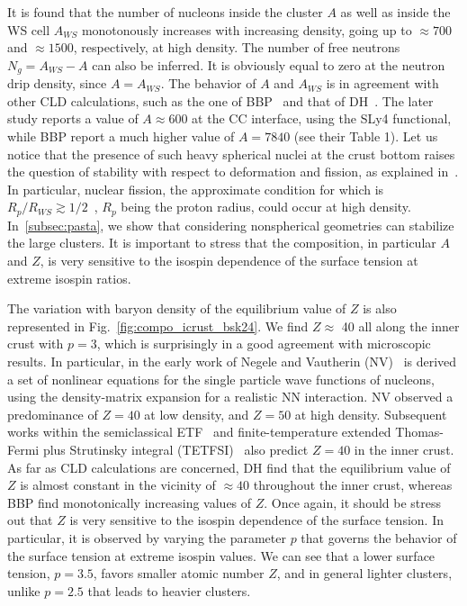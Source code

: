 It is found that the number of nucleons inside the cluster $A$ as well as inside 
the WS cell $A_{WS}$ monotonously increases with increasing density, going up 
to $\approx 700$ and $\approx 1500$, respectively, at high density. The number 
of free neutrons $N_g = A_{WS} - A$ can also be inferred. It is obviously equal 
to zero at the neutron drip density, since $A=A_{WS}$.
The behavior of $A$ and $A_{WS}$ is in agreement with other CLD calculations, 
such as the one of BBP~\cite{BBP} and that of DH~\cite{Douchin2000a}. The later 
study reports a value of $A \approx 600$ at the CC interface, using the 
SLy4 functional, while BBP report a much higher value of $A=7840$ (see their 
Table 1). Let us notice that the presence of such heavy spherical nuclei at the
crust bottom raises the question of stability with respect to deformation and
fission, as explained in~\cite{Douchin2000a}. In particular, nuclear fission, 
the approximate condition for which is $R_p/R_{WS} \gtrsim
1/2$~\cite{Bohr1939,Pethick1995}, $R_p$ being the
proton radius, could occur at high density. In~\ref{subsec:pasta}, we show that 
considering nonspherical geometries can stabilize the large clusters. It is 
important to stress that the composition, in particular $A$ and $Z$, is very 
sensitive to the isospin dependence of the surface tension at extreme isospin 
ratios. 

The variation with baryon density of the equilibrium value of $Z$ is also 
represented in Fig.~\ref{fig:compo_icrust_bsk24}. We find $Z \approx$ 40 all
along the inner crust with $p=3$, which is surprisingly in a good agreement with 
microscopic results. In particular, in the early work of Negele and Vautherin
(NV)~\cite{Negele1973} is derived a set of nonlinear equations for the single
particle wave functions of nucleons, using the density-matrix expansion for a
realistic NN interaction. NV observed a predominance of $Z=40$ at low density, 
and $Z=50$ at high density. Subsequent works within the semiclassical
ETF~\cite{Goriely2005} and finite-temperature extended Thomas-Fermi plus
Strutinsky integral (TETFSI)~\cite{Onsi2008,Pearson2018} also predict $Z=40$ in
the inner crust. As far as CLD calculations are concerned, DH find that the 
equilibrium value of $Z$ is almost constant in the vicinity of $\approx 40$ 
throughout the inner crust, whereas BBP find monotonically increasing values of $Z$. 
Once again, it should be stress out that $Z$ is very sensitive to the isospin
dependence of the surface tension. In particular, it is observed by varying 
the parameter $p$ that governs the behavior of the surface tension at extreme 
isospin values. We can see that a lower surface tension, $p=3.5$, favors smaller 
atomic number $Z$, and in general lighter clusters, unlike $p=2.5$ that leads to 
heavier clusters.

